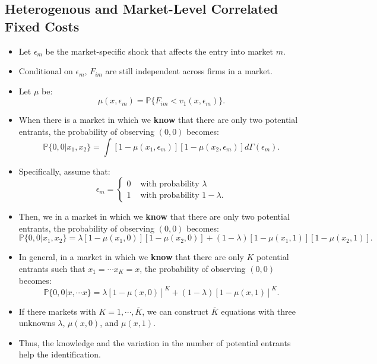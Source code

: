 \documentclass[
]{book}
\begin{document}
\hypertarget{heterogenous-and-market-level-correlated-fixed-costs}{%
\subsection{Heterogenous and Market-Level Correlated Fixed Costs}\label{heterogenous-and-market-level-correlated-fixed-costs}}

\begin{itemize}
\item
  Let \(\epsilon_m\) be the market-specific shock that affects the entry into market \(m\).
\item
  Conditional on \(\epsilon_m\), \(F_{im}\) are still independent across firms in a market.
\item
  Let \(\mu\) be:
  \[
  \mu(x, \epsilon_m) = \mathbb{P}\{F_{im} < v_1(x, \epsilon_m)\}.
  \]
\item
  When there is a market in which we \textbf{know} that there are only two potential entrants, the probability of observing \((0, 0)\) becomes:
  \[
  \mathbb{P}\{0, 0|x_1, x_2\} = \int [1 - \mu(x_1, \epsilon_m)] [1 - \mu(x_2, \epsilon_m)] d \Gamma(\epsilon_m).
  \]
\item
  Specifically, assume that:
  \[
  \epsilon_m 
  = 
  \begin{cases}
  0 & \text{   with probability   } \lambda \\
  1 & \text{   with probability   } 1 - \lambda.
  \end{cases}
  \]
\item
  Then, we in a market in which we \textbf{know} that there are only two potential entrants, the probability of observing \((0, 0)\) becomes:
  \[
  \mathbb{P}\{0, 0|x_1, x_2\} = \lambda [1 - \mu(x_1, 0)] [1 - \mu(x_2, 0)] + (1 - \lambda) [1 - \mu(x_1, 1)] [1 - \mu(x_2, 1)].
  \]
\item
  In general, in a market in which we \textbf{know} that there are only \(K\) potential entrants such that \(x_1 = \cdots x_K = x\), the probability of observing \((0, 0)\) becomes:
  \[
  \mathbb{P}\{0, 0|x, \cdots x\} = \lambda [1 - \mu(x, 0)]^K + (1 - \lambda) [1 - \mu(x, 1)]^K.
  \]
\item
  If there markets with \(K = 1, \cdots, \overline{K}\), we can construct \(\overline{K}\) equations with three unknowns \(\lambda\), \(\mu(x, 0)\), and \(\mu(x, 1)\).
\item
  Thus, the knowledge and the variation in the number of potential entrants help the identification.
\end{itemize}
\end{document}
